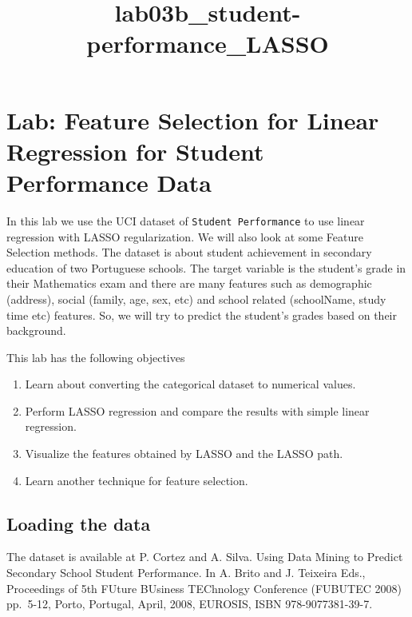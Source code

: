 \documentclass[11pt]{article}
\title{lab03b\_student-performance\_LASSO}
\providecommand{\tightlist}{%
      \setlength{\itemsep}{0pt}\setlength{\parskip}{0pt}}
\begin{document}
    
    
    \maketitle
    
    

    
    \hypertarget{lab-feature-selection-for-linear-regression-for-student-performance-data}{%
\section{Lab: Feature Selection for Linear Regression for Student
Performance
Data}\label{lab-feature-selection-for-linear-regression-for-student-performance-data}}

In this lab we use the UCI dataset of \texttt{Student\ Performance} to
use linear regression with LASSO regularization. We will also look at
some Feature Selection methods. The dataset is about student achievement
in secondary education of two Portuguese schools. The target variable is
the student's grade in their Mathematics exam and there are many
features such as demographic (address), social (family, age, sex, etc)
and school related (schoolName, study time etc) features. So, we will
try to predict the student's grades based on their background.

This lab has the following objectives

\begin{enumerate}
\def\labelenumi{\arabic{enumi}.}
\tightlist
\item
  Learn about converting the categorical dataset to numerical values.
\item
  Perform LASSO regression and compare the results with simple linear
  regression.
\item
  Visualize the features obtained by LASSO and the LASSO path.
\item
  Learn another technique for feature selection.
\end{enumerate}

    \hypertarget{loading-the-data}{%
\subsection{Loading the data}\label{loading-the-data}}

The dataset is available at P. Cortez and A. Silva. Using Data Mining to
Predict Secondary School Student Performance. In A. Brito and J.
Teixeira Eds., Proceedings of 5th FUture BUsiness TEChnology Conference
(FUBUTEC 2008) pp.~5-12, Porto, Portugal, April, 2008, EUROSIS, ISBN
978-9077381-39-7.
\end{document}
